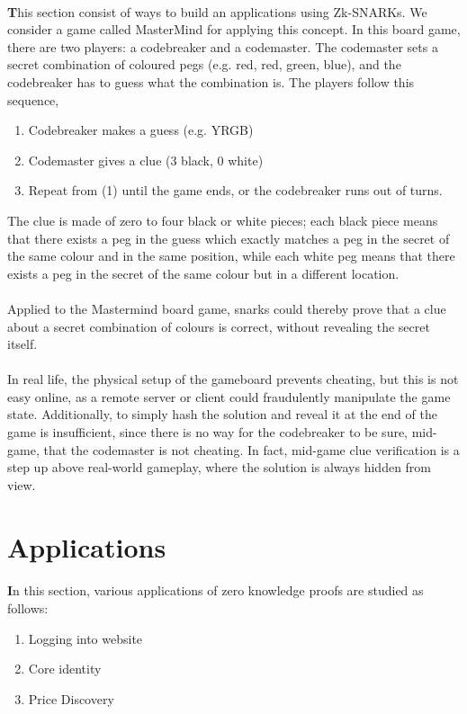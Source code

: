 \documentclass[12pt]{article}
\theoremstyle{definition}
\theoremstyle{remark}
\theoremstyle{definition}
\begin{document}
\paragraph*{}
\textbf This section consist of ways to build an applications using Zk-SNARKs. We consider a game called MasterMind for applying this concept. In this board game, there are two players: a codebreaker and a codemaster. The codemaster sets a secret combination of coloured pegs (e.g. red, red, green, blue), and the codebreaker has to guess what the combination is. The players follow this sequence,
\begin{enumerate}
  \item Codebreaker makes a guess (e.g. YRGB)
  \item Codemaster gives a clue (3 black, 0 white)
  \item Repeat from (1) until the game ends, or the codebreaker runs out of turns.
\end{enumerate}
The clue is made of zero to four black or white pieces; each black piece means that there exists a peg in the guess which exactly matches a peg in the secret of the same colour and in the same position, while each white peg means that there exists a peg in the secret of the same colour but in a different location.
\\
\\
Applied to the Mastermind board game, snarks could thereby prove that a clue about a secret combination of colours is correct, without revealing the secret itself.
\\
\\
In real life, the physical setup of the gameboard prevents cheating, but this is not easy online, as a remote server or client could fraudulently manipulate the game state. Additionally, to simply hash the solution and reveal it at the end of the game is insufficient, since there is no way for the codebreaker to be sure, mid-game, that the codemaster is not cheating. In fact, mid-game clue verification is a step up above real-world gameplay, where the solution is always hidden from view.


\newpage





\section{Applications}
\paragraph*{}
\textbf In this section, various applications of zero knowledge proofs are studied as follows:
\begin{enumerate}
  \item Logging into website
  \item Core identity
  \item Price Discovery
\end{enumerate}
\end{document}
